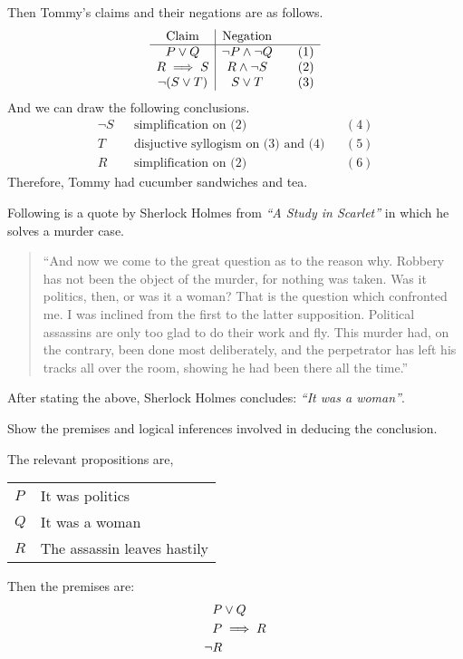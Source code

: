 \documentclass[a4paper]{exam}
\begin{document}
\begin{questions}
\begin{solution}
    Then Tommy's claims and their negations are as follows.
    \[
      \begin{array}{c|c@{\qquad}r}
        \text{Claim} & \text{Negation}\\
        \hline
        P \lor Q & \neg P \land \neg Q &  (1)\\
        R \implies S & R\land \neg S &  (2)\\
        \neg(S\lor T) & S\lor T &  (3)
      \end{array}
    \]
    And we can draw the following conclusions.
    \begin{align*}
      \neg S && \text{simplification on (2)} && (4)\\
      T && \text{disjuctive syllogism on (3) and (4)} && (5)\\
      R && \text{simplification on (2)} && (6)
    \end{align*}
    Therefore, Tommy had cucumber sandwiches and tea.
  \end{solution}

  \question Following is a quote by Sherlock Holmes from \textit{“A Study in Scarlet”} in which he solves a murder case.
\begin{quote}
``And now we come to the great question as to the reason why. Robbery has not been the object of the murder, for nothing was taken. Was it politics, then, or was it a woman? That is the question which confronted me. I was inclined from the first to the latter supposition. Political assassins are only too glad to do their work and fly. This murder had, on the contrary, been done most deliberately, and the perpetrator has left his tracks all over the room, showing he had been there all the time.''
\end{quote}
After stating the above, Sherlock Holmes concludes: \textit{``It was a woman''}.

Show the premises and logical inferences involved in deducing the conclusion.

  \begin{solution}
    The relevant propositions are,\\
    \begin{tabular}{l@{ : }l}
      $P$ & It was politics\\
      $Q$ & It was a woman\\
      $R$ & The assassin leaves hastily
    \end{tabular}

    Then the premises are:
    \begin{align}
    \setcounter{equation}{0}
      P & \lor Q \label{pa}\\
      P & \implies R \label{pb}\\
      \neg R \label{pc}
    \end{align}


\end{solution}
\end{questions}
\end{document}

